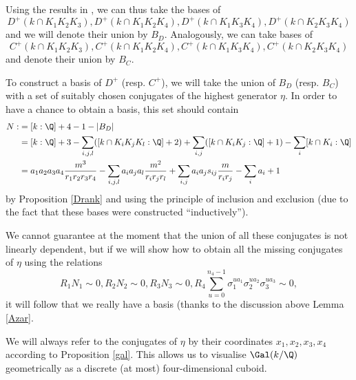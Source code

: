 Using the results in \citep{Kucera2016}, we can thus take the bases of $$D^+(k\cap K_1K_2K_3),D^+(k\cap K_1K_2K_4),D^+(k\cap K_1K_3K_4),D^+(k\cap K_2K_3K_4)$$
and we will denote their union by $B_D$. Analogously, we can take bases of $$C^+(k\cap K_1K_2K_3),C^+(k\cap K_1K_2K_4),C^+(k\cap K_1K_3K_4),C^+(k\cap K_2K_3K_4)$$
and denote their union by $B_C$.

To construct a basis of $D^+$ (resp. $C^+$), we will take the union of $B_D$ (resp. $B_C$) with a set of suitably chosen conjugates of the highest generator $\eta$. In order to have a chance to obtain a basis, this set should contain
\begin{equation*}
\begin{split}
N:&=[k:\Q]+4-1-|B_D|\\
&=[k:\Q]+3-\sum_{i,j,l}([k\cap K_iK_jK_l:\Q]+2)+\sum_{i,j}([k\cap K_iK_j:\Q]+1)-\sum_{i}[k\cap K_i:\Q]\\
&=a_1a_2a_3a_4\frac{m^3}{r_1r_2r_3r_4}-\sum_{i,j,l}a_ia_ja_l\frac{m^2}{r_ir_jr_l}+\sum_{i,j}
a_ia_js_{ij}\frac{m}{r_ir_j}-\sum_{i}a_i+1
\end{split}
\end{equation*}
by Proposition \ref{Drank} and using the principle of inclusion and exclusion (due to the fact that these bases were constructed \enquote{inductively}).

We cannot guarantee at the moment that the union of all these conjugates is not linearly dependent, but if we will show how to obtain all the missing conjugates of $\eta$ using the relations $$R_1N_1\sim 0, R_2N_2\sim 0, R_3N_3\sim 0, R_4\sum_{u=0}^{n_4-1}\sigma_1^{ua_1}\sigma_2^{ua_2}\sigma_3^{ua_3}\sim 0,$$
it will follow that we really have a basis (thanks to the discussion above Lemma \ref{Azar}.

We will always refer to the conjugates of $\eta$ by their coordinates $x_1,x_2,x_3,x_4$ according to Proposition \ref{gal}. This allows us to visualise $\Gal(k/\Q)$ geometrically as a discrete (at most) four-dimensional cuboid.

